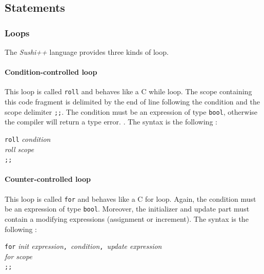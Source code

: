 \documentclass[a4paper,11pt]{article}
\begin{document}
\subsection{Statements}
\subsubsection{Loops}
The \textit{Sushi++} language provides three kinds of loop.
\paragraph{Condition-controlled loop} This loop is called \texttt{roll} and behaves like a C while loop. The scope containing this code fragment is delimited by the end of line following the condition and the scope delimiter \texttt{;;}. The condition must be an expression of type \texttt{bool}, otherwise the compiler will return a type error. . The syntax is the following :
\begin{center}
	\begin{minipage}{0.20\linewidth}
		\texttt{roll} \textit{condition} \\
		\text{ }\text{ }\text{ }\text{ }\textit{roll scope}\\
		\texttt{;;}\\
	\end{minipage}
\end{center}
\paragraph{Counter-controlled loop} This loop is called \texttt{for} and behaves like a C for loop. Again, the condition must be an expression of type \texttt{bool}. Moreover, the initializer and update part must contain a modifying expressions (assignment or increment). The syntax is the following :
\begin{center}
	\begin{minipage}{0.50\linewidth}
		\texttt{for} \textit{init expression}\texttt{, }\textit{condition}\texttt{, }\textit{update expression} \\
		\text{ }\text{ }\text{ }\text{ }\textit{for scope}\\
		\texttt{;;}\\
	\end{minipage}
\end{center}
\end{document}
